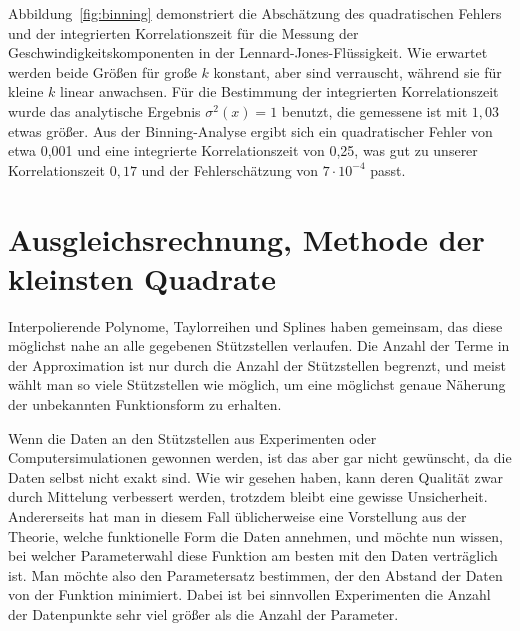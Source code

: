 Abbildung~\ref{fig:binning} demonstriert die Abschätzung des
quadratischen Fehlers und der integrierten Korrelationszeit für
die Messung der Geschwindigkeitskomponenten in der
Lennard-Jones-Flüssigkeit. Wie erwartet werden beide Größen für große
$k$ konstant, aber sind verrauscht, während sie für kleine $k$ linear
anwachsen.  Für die Bestimmung der integrierten Korrelationszeit
wurde das analytische Ergebnis $\sigma^2(x)=1$ benutzt, die gemessene
ist mit $1,03$ etwas größer. Aus der Binning-Analyse ergibt sich ein
quadratischer Fehler von etwa 0,001 und eine integrierte
Korrelationszeit von 0,25, was gut zu unserer Korrelationszeit
$0,17$ und der Fehlerschätzung von $7\cdot 10^{-4}$ passt.

\section{Ausgleichsrechnung, Methode der kleinsten Quadrate}

Interpolierende Polynome, Taylorreihen und Splines haben gemeinsam,
das diese möglichst nahe an alle gegebenen Stützstellen verlaufen. Die
Anzahl der Terme in der Approximation ist nur durch die Anzahl der
Stützstellen begrenzt, und meist wählt man so viele Stützstellen wie
möglich, um eine möglichst genaue Näherung der unbekannten
Funktionsform zu erhalten.

Wenn die Daten an den Stützstellen aus Experimenten oder
Computersimulationen gewonnen werden, ist das aber gar nicht
gewünscht, da die Daten selbst nicht exakt sind. Wie wir gesehen
haben, kann deren Qualität zwar durch Mittelung verbessert werden,
trotzdem bleibt eine gewisse Unsicherheit.  Andererseits hat man in
diesem Fall üblicherweise eine Vorstellung aus der Theorie, welche
funktionelle Form die Daten annehmen, und möchte nun wissen, bei
welcher Parameterwahl diese Funktion am besten mit den Daten
verträglich ist. Man möchte also den Parametersatz bestimmen, der den
Abstand der Daten von der Funktion minimiert. Dabei ist bei sinnvollen
Experimenten die Anzahl der Datenpunkte sehr viel größer als die
Anzahl der Parameter.

